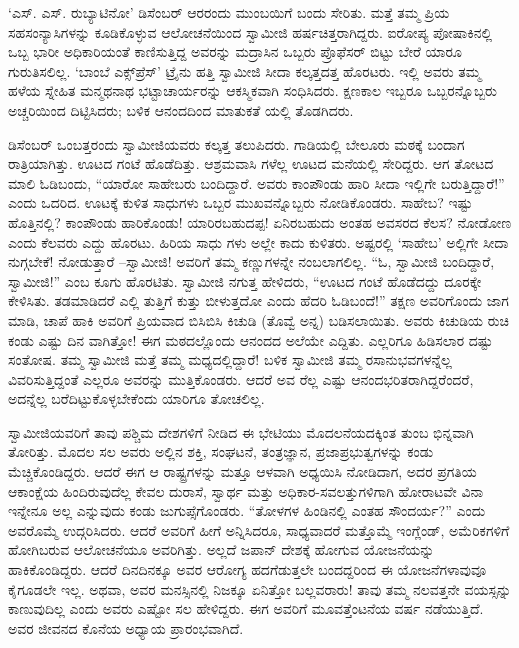 ‘ಎಸ್. ಎಸ್. ರುಬ್ಯಾಟಿನೋ’ ಡಿಸೆಂಬರ್ ಆರರಂದು ಮುಂಬಯಿಗೆ ಬಂದು ಸೇರಿತು. ಮತ್ತೆ ತಮ್ಮ ಪ್ರಿಯ ಸಹಸಂನ್ಯಾಸಿಗಳನ್ನು ಕೂಡಿಕೊಳ್ಳುವ ಆಲೋಚನೆಯಿಂದ ಸ್ವಾಮೀಜಿ ಹರ್ಷಚಿತ್ತರಾಗಿದ್ದರು. ಐರೋಪ್ಯ ಪೋಷಾಕಿನಲ್ಲಿ ಒಬ್ಬ ಭಾರೀ ಅಧಿಕಾರಿಯಂತೆ ಕಾಣಿಸುತ್ತಿದ್ದ ಅವರನ್ನು ಮದ್ರಾಸಿನ ಒಬ್ಬರು ಪ್ರೊಫೆಸರ್ ಬಿಟ್ಟು ಬೇರೆ ಯಾರೂ ಗುರುತಿಸಲಿಲ್ಲ. ‘ಬಾಂಬೆ ಎಕ್ಸ್​ಪ್ರೆಸ್​’ ಟ್ರೈನು ಹತ್ತಿ ಸ್ವಾಮೀಜಿ ಸೀದಾ ಕಲ್ಕತ್ತದತ್ತ ಹೊರಟರು. ಇಲ್ಲಿ ಅವರು ತಮ್ಮ ಹಳೆಯ ಸ್ನೇಹಿತ ಮನ್ಮಥನಾಥ ಭಟ್ಟಾಚಾರ್ಯರನ್ನು ಆಕಸ್ಮಿಕವಾಗಿ ಸಂಧಿಸಿದರು. ಕ್ಷಣಕಾಲ ಇಬ್ಬರೂ ಒಬ್ಬರನ್ನೊಬ್ಬರು ಅಚ್ಚರಿಯಿಂದ ದಿಟ್ಟಿಸಿದರು; ಬಳಿಕ ಆನಂದದಿಂದ ಮಾತುಕತೆ ಯಲ್ಲಿ ತೊಡಗಿದರು.

ಡಿಸೆಂಬರ್ ಒಂಬತ್ತರಂದು ಸ್ವಾಮೀಜಿಯವರು ಕಲ್ಕತ್ತ ತಲುಪಿದರು. ಗಾಡಿಯಲ್ಲಿ ಬೇಲೂರು ಮಠಕ್ಕೆ ಬಂದಾಗ ರಾತ್ರಿಯಾಗಿತ್ತು. ಊಟದ ಗಂಟೆ ಹೊಡೆದಿತ್ತು. ಆಶ್ರಮವಾಸಿ ಗಳೆಲ್ಲ ಊಟದ ಮನೆಯಲ್ಲಿ ಸೇರಿದ್ದರು. ಆಗ ತೋಟದ ಮಾಲಿ ಓಡಿಬಂದು, “ಯಾರೋ ಸಾಹೇಬರು ಬಂದಿದ್ದಾರೆ. ಅವರು ಕಾಂಪೌಂಡು ಹಾರಿ ಸೀದಾ ಇಲ್ಲಿಗೇ ಬರುತ್ತಿದ್ದಾರೆ!” ಎಂದು ಒದರಿದ. ಊಟಕ್ಕೆ ಕುಳಿತ ಸಾಧುಗಳು ಒಬ್ಬರ ಮುಖವನ್ನೊಬ್ಬರು ನೋಡಿಕೊಂಡರು. ಸಾಹೇಬ? ಇಷ್ಟು ಹೊತ್ತಿನಲ್ಲಿ? ಕಾಂಪೌಂಡು ಹಾರಿಕೊಂಡು! ಯಾರಿರಬಹುದಪ್ಪ! ಏನಿರಬಹುದು ಅಂತಹ ಅವಸರದ ಕೆಲಸ? ನೋಡೋಣ ಎಂದು ಕೆಲವರು ಎದ್ದು ಹೊರಟು. ಹಿರಿಯ ಸಾಧು ಗಳು ಅಲ್ಲೇ ಕಾದು ಕುಳಿತರು. ಅಷ್ಟರಲ್ಲಿ ‘ಸಾಹೇಬ’ ಅಲ್ಲಿಗೇ ಸೀದಾ ನುಗ್ಗಬೇಕೆ! ನೋಡುತ್ತಾರೆ –ಸ್ವಾಮೀಜಿ! ಅವರಿಗೆ ತಮ್ಮ ಕಣ್ಣುಗಳನ್ನೇ ನಂಬಲಾಗಲಿಲ್ಲ. “ಓ, ಸ್ವಾಮೀಜಿ ಬಂದಿದ್ದಾರೆ, ಸ್ವಾಮೀಜಿ!” ಎಂಬ ಕೂಗು ಹೊರಟಿತು. ಸ್ವಾಮೀಜಿ ನಗುತ್ತ ಹೇಳಿದರು, “ಊಟದ ಗಂಟೆ ಹೊಡೆದದ್ದು ದೂರಕ್ಕೇ ಕೇಳಿಸಿತು. ತಡಮಾಡಿದರೆ ಎಲ್ಲಿ ತುತ್ತಿಗೆ ಕುತ್ತು ಬೀಳುತ್ತದೋ ಎಂದು ಹೆದರಿ ಓಡಿಬಂದೆ!” ತಕ್ಷಣ ಅವರಿಗೊಂದು ಜಾಗ ಮಾಡಿ, ಚಾಪೆ ಹಾಕಿ ಅವರಿಗೆ ಪ್ರಿಯವಾದ ಬಿಸಿಬಿಸಿ ಕಿಚುಡಿ (ತೊವ್ವೆ ಅನ್ನ) ಬಡಿಸಲಾಯಿತು. ಅವರು ಕಿಚುಡಿಯ ರುಚಿ ಕಂಡು ಎಷ್ಟು ದಿನ ವಾಗಿತ್ತೋ! ಈಗ ಮಠದಲ್ಲೊಂದು ಆನಂದದ ಅಲೆಯೇ ಎದ್ದಿತು. ಎಲ್ಲರಿಗೂ ಹಿಡಿಸಲಾರ ದಷ್ಟು ಸಂತೋಷ. ತಮ್ಮ ಸ್ವಾಮೀಜಿ ಮತ್ತೆ ತಮ್ಮ ಮಧ್ಯದಲ್ಲಿದ್ದಾರೆ! ಬಳಿಕ ಸ್ವಾಮೀಜಿ ತಮ್ಮ ರಸಾನುಭವಗಳನ್ನೆಲ್ಲ ವಿವರಿಸುತ್ತಿದ್ದಂತೆ ಎಲ್ಲರೂ ಅವರನ್ನು ಮುತ್ತಿಕೊಂಡರು. ಆದರೆ ಅವ ರೆಲ್ಲ ಎಷ್ಟು ಆನಂದಭರಿತರಾಗಿದ್ದರೆಂದರೆ, ಅದನ್ನೆಲ್ಲ ಬರೆದಿಟ್ಟುಕೊಳ್ಳಬೇಕೆಂದು ಯಾರಿಗೂ ತೋಚಲಿಲ್ಲ.

ಸ್ವಾಮೀಜಿಯವರಿಗೆ ತಾವು ಪಶ್ಚಿಮ ದೇಶಗಳಿಗೆ ನೀಡಿದ ಈ ಭೇಟಿಯು ಮೊದಲನೆಯದಕ್ಕಿಂತ ತುಂಬ ಭಿನ್ನವಾಗಿ ತೋರಿತ್ತು. ಮೊದಲ ಸಲ ಅವರು ಅಲ್ಲಿನ ಶಕ್ತಿ, ಸಂಘಟನೆ, ತಂತ್ರಜ್ಞಾನ, ಪ್ರಜಾಪ್ರಭುತ್ವಗಳನ್ನು ಕಂಡು ಮೆಚ್ಚಿಕೊಂಡಿದ್ದರು. ಆದರೆ ಈಗ ಆ ರಾಷ್ಟ್ರಗಳನ್ನು ಮತ್ತೂ ಆಳವಾಗಿ ಅಧ್ಯಯಿಸಿ ನೋಡಿದಾಗ, ಅದರ ಪ್ರಗತಿಯ ಆಕಾಂಕ್ಷೆಯ ಹಿಂದಿರುವುದೆಲ್ಲ ಕೇವಲ ದುರಾಸೆ, ಸ್ವಾರ್ಥ ಮತ್ತು ಅಧಿಕಾರ-ಸವಲತ್ತುಗಳಿಗಾಗಿ ಹೋರಾಟವೇ ವಿನಾ ಇನ್ನೇನೂ ಅಲ್ಲ ಎನ್ನುವುದು ಕಂಡು ಜುಗುಪ್ಸೆಗೊಂಡರು. “ತೋಳಗಳ ಹಿಂಡಿನಲ್ಲಿ ಎಂತಹ ಸೌಂದರ್ಯ?” ಎಂದು ಅವರೊಮ್ಮೆ ಉದ್ಗರಿಸಿದರು. ಆದರೆ ಅವರಿಗೆ ಹೀಗೆ ಅನ್ನಿಸಿದರೂ, ಸಾಧ್ಯವಾದರೆ ಮತ್ತೊಮ್ಮೆ ಇಂಗ್ಲೆಂಡ್, ಅಮೆರಿಕಗಳಿಗೆ ಹೋಗಿಬರುವ ಆಲೋಚನೆಯೂ ಅವರಿಗಿತ್ತು. ಅಲ್ಲದೆ ಜಪಾನ್ ದೇಶಕ್ಕೆ ಹೋಗುವ ಯೋಜನೆಯನ್ನು ಹಾಕಿಕೊಂಡಿದ್ದರು. ಆದರೆ ದಿನದಿನಕ್ಕೂ ಅವರ ಆರೋಗ್ಯ ಹದಗೆಡುತ್ತಲೇ ಬಂದದ್ದರಿಂದ ಈ ಯೋಜನೆಗಳಾವುವೂ ಕೈಗೂಡಲೇ ಇಲ್ಲ. ಅಥವಾ, ಅವರ ಮನಸ್ಸಿನಲ್ಲಿ ನಿಜಕ್ಕೂ ಏನಿತ್ತೋ ಬಲ್ಲವರಾರು! ತಾವು ತಮ್ಮ ನಲವತ್ತನೇ ವಯಸ್ಸನ್ನು ಕಾಣುವುದಿಲ್ಲ ಎಂದು ಅವರು ಎಷ್ಟೋ ಸಲ ಹೇಳಿದ್ದರು. ಈಗ ಅವರಿಗೆ ಮೂವತ್ತೆಂಟನೆಯ ವರ್ಷ ನಡೆಯುತ್ತಿದೆ. ಅವರ ಜೀವನದ ಕೊನೆಯ ಅಧ್ಯಾಯ ಪ್ರಾರಂಭವಾಗಿದೆ.

